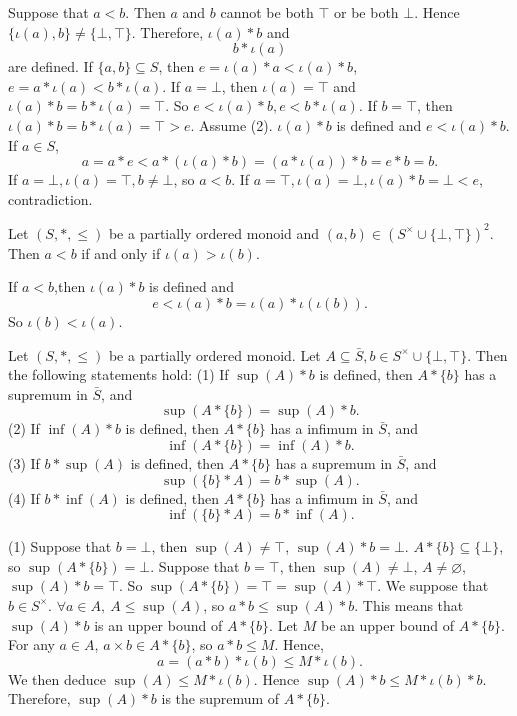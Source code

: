 \begin{proofenv}
    Suppose that $a<b$. Then $a$ and $b$ cannot be both $\top$ or be both $\bot$. Hence $\{\iota(a),b\}\not=\{\bot,\top\}$. Therefore, $\iota(a)*b$ and $$b*\iota(a)$$ are defined. If $\{a,b\}\subseteq S$, then $e=\iota(a)*a<\iota(a)*b$, $e=a*\iota(a)<b*\iota(a)$. If $a=\bot$, then $\iota(a)=\top$ and $\iota(a)*b=b*\iota(a)=\top$. So $e<\iota(a)*b,e<b*\iota(a)$. If $b=\top$, then $\iota(a)*b=b*\iota(a)=\top>e$.
    \newline
    Assume (2). $\iota(a)*b$ is defined and $e<\iota(a)*b$. If $a\in S$,
    $$a=a*e<a*(\iota(a)*b)=(a*\iota(a))*b=e*b=b.$$
    If $a=\bot, \iota(a)=\top, b\not=\bot$, so $a<b$. If $a=\top, \iota (a)=\bot, \iota(a)*b=\bot<e$, contradiction.
\end{proofenv}
\begin{corollaryenv}
    Let $(S,*,\le)$ be a partially ordered monoid and $(a,b)\in \left(S^\times\cup\{\bot,\top\}\right)^2$. Then $a<b$ if and only if $\iota(a)>\iota(b)$.
\end{corollaryenv}
\begin{proofenv}
    If $a<b$,then $\iota(a)*b$ is defined and 
    $$e<\iota(a)*b=\iota(a)*\iota(\iota(b)).$$
    So $\iota(b)<\iota(a)$.
\end{proofenv}
\begin{lemmaenv}
    Let $(S,*,\le)$ be a partially ordered monoid. Let $A\subseteq \bar{S}, b\in S^\times\cup\{\bot,\top\}$. Then the following statements hold:
    \newline
    (1) If $\sup(A)*b$ is defined, then $A*\{b\}$ has a supremum in $\bar{S}$, and $$\sup(A*\{b\})=\sup(A)*b.$$
    (2) If $\inf(A)*b$ is defined, then $A*\{b\}$ has a infimum in $\bar{S}$, and $$\inf(A*\{b\})=\inf(A)*b.$$
    (3) If $b*\sup(A)$ is defined, then $A*\{b\}$ has a supremum in $\bar{S}$, and $$\sup(\{b\}*A)=b*\sup(A).$$
    (4) If $b*\inf(A)$ is defined, then $A*\{b\}$ has a infimum in $\bar{S}$, and $$\inf(\{b\}*A)=b*\inf(A).$$
\end{lemmaenv}
\begin{proofenv}
    \quad \newline
    (1) Suppose that $b=\bot$, then $\sup(A)\not=\top$, $\sup(A)*b=\bot$. $A*\{b\}\subseteq\{\bot\}$, so $\sup(A*\{b\})=\bot$.
    Suppose that $b=\top$, then $\sup(A)\not=\bot$, $A\not=\varnothing$, $\sup(A)*b=\top$. So $\sup(A*\{b\})=\top=\sup(A)*\top$.
    We suppose that $b\in S^\times$. $\forall a\in A,\ A\le \sup(A)$, so $a*b\le \sup(A)*b$. This means that $\sup(A)*b$ is an upper bound of $A*\{b\}$. Let $M$ be an upper bound of $A*\{b\}$. For any $a\in A$, $a\times b\in A*\{b\}$, so $a*b\le M$. Hence, 
    $$a=(a*b)*\iota(b)\le M*\iota(b).$$
    We then deduce $\sup(A)\le M*\iota(b)$. Hence $\sup(A)*b\le M*\iota(b)*b$. Therefore, $\sup(A)*b$ is the supremum of $A*\{b\}$.
\end{proofenv}
